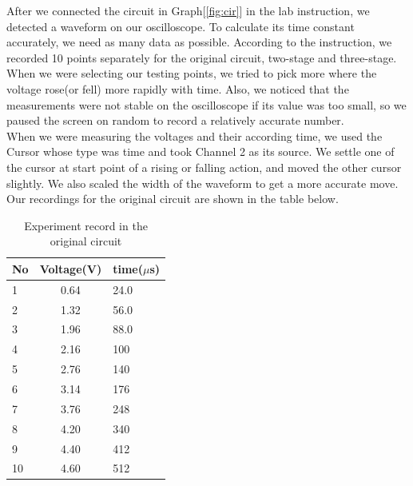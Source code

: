 \hfill \newline
\phantom{ } After we connected the circuit in Graph[\ref{fig:cir}] in the lab instruction, we detected a waveform on our oscilloscope. To calculate its time constant accurately, we need as many data as possible. According to the instruction, we recorded 10 points separately for the original circuit, two-stage and three-stage. When we were selecting our testing points, we tried to pick more where the voltage rose(or fell) more rapidly with time. Also, we noticed that the measurements were not stable on the oscilloscope if its value was too small, so we paused the screen on random to record a relatively accurate number.\\
\phantom{ } When we were measuring the voltages and their according time, we used the Cursor whose type was time and took Channel 2 as its source. We settle one of the cursor at start point of a rising or falling action, and moved the other cursor slightly. We also scaled the width of the waveform to get a more accurate move.\\
\phantom{ } Our recordings for the original circuit are shown in the table below.

\begin{table}[!htbp]\centering
	\caption{Experiment record in the original circuit}
	\renewcommand\arraystretch{1.5}
	\begin{tabular}{lcl}
		\toprule
		No		&Voltage(V)	&time($\mu$s)	\\
		\midrule
		1		&0.64		&24.0		\\
		
		2		&1.32		&56.0		\\
		
		3		&1.96		&88.0		\\
		
		4		&2.16		&100		\\
		
		5		&2.76		&140		\\
		
		6		&3.14		&176		\\
		
		7		&3.76		&248		\\
		
		8		&4.20		&340		\\
		
		9		&4.40		&412		\\
		
		10		&4.60		&512		\\
		\bottomrule
	\end{tabular}
\end{table}

